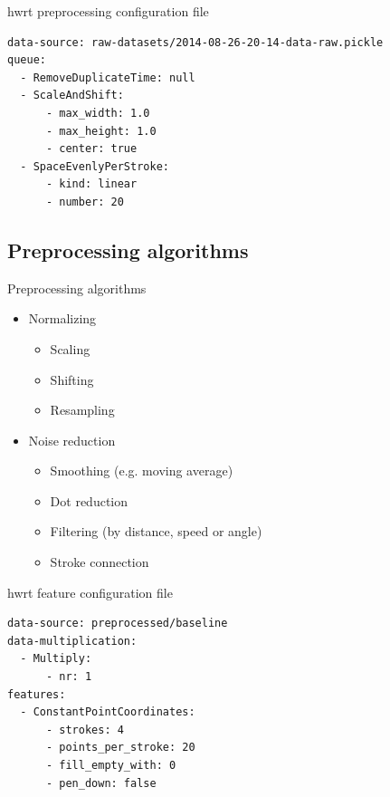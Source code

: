 \begin{frame}[fragile]{hwrt preprocessing configuration file}
    \begin{verbatim}
data-source: raw-datasets/2014-08-26-20-14-data-raw.pickle
queue:
  - RemoveDuplicateTime: null
  - ScaleAndShift:
      - max_width: 1.0
      - max_height: 1.0
      - center: true
  - SpaceEvenlyPerStroke:
      - kind: linear
      - number: 20
    \end{verbatim}
\end{frame}

\subsection{Preprocessing algorithms}
\begin{frame}{Preprocessing algorithms}
    \begin{itemize}
        \item Normalizing
        \begin{itemize}
            \item Scaling
            \item Shifting
            \item Resampling
        \end{itemize}
        \item Noise reduction
        \begin{itemize}
            \item Smoothing (e.g. moving average)
            \item Dot reduction
            \item Filtering (by distance, speed or angle)
            \item Stroke connection
        \end{itemize}
    \end{itemize}
\end{frame}

\begin{frame}[fragile]{hwrt feature configuration file}
    \begin{verbatim}
data-source: preprocessed/baseline
data-multiplication:
  - Multiply:
      - nr: 1
features:
  - ConstantPointCoordinates:
      - strokes: 4
      - points_per_stroke: 20
      - fill_empty_with: 0
      - pen_down: false
    \end{verbatim}
\end{frame}

